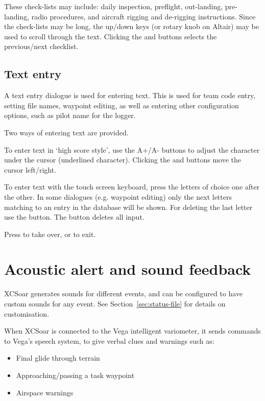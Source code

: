 These check-lists may include: daily inspection, preflight, out-landing,
pre-landing, radio procedures, and aircraft rigging and de-rigging
instructions.  Since the check-lists may be long, the up/down keys (or rotary
knob on Altair) may be used to scroll through the text. Clicking the
\button{$<$} and \button{$>$} buttons selects the previous/next checklist.


\subsection*{Text entry} \label{sec:textentry}

A text entry dialogue is used for entering text.  This is used for team
code entry, setting file names, waypoint editing, as well as entering
other configuration options, such as pilot name for the logger.

Two ways of entering text are provided.

To enter text in `high score style', use the A+/A- buttons to adjust the
character under the cursor (underlined character). Clicking the \button{$<$}
and \button{$>$} buttons move the cursor left/right.

To enter text with the touch screen keyboard, press the letters of choice
one after the other. In some dialogues (e.g. waypoint editing) only the next
letters matching to an entry in the database will be shown. For deleting the
last letter use the \button{$<-$} button. The  button deletes all input.

Press  to take over, or  to exit.


\section{Acoustic alert and sound feedback}

XCSoar generates sounds for different events, and can be configured to
have custom sounds for any event.  See Section~\ref{sec:status-file} for
details on customisation.

When XCSoar is connected to the Vega intelligent variometer, it sends
commands to Vega's speech system, to give verbal clues and warnings such as:
\begin{itemize}
\item Final glide through terrain
\item Approaching/passing a task waypoint
\item Airspace warnings
\end{itemize}

